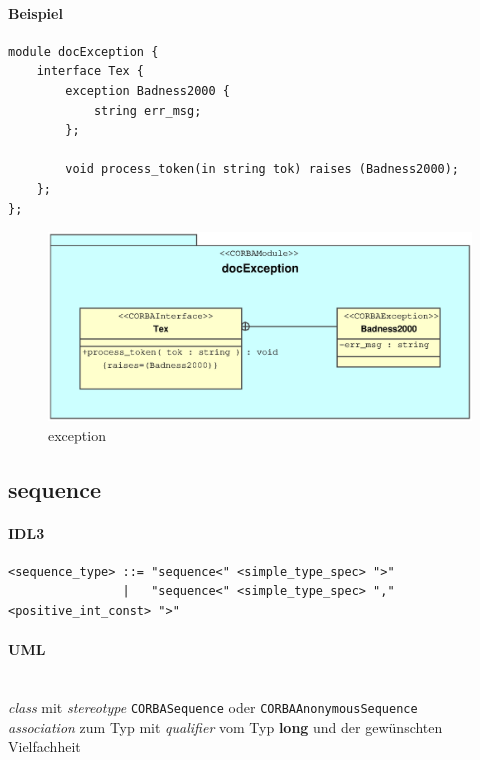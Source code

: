 \documentclass [a4paper,10pt] {scrartcl}
\begin{document}
\paragraph{Beispiel}
\begin{verbatim}
module docException {
    interface Tex {
        exception Badness2000 {
            string err_msg;
        };

        void process_token(in string tok) raises (Badness2000);
    };
};
\end{verbatim}
\begin{figure}[!h]
\centerline{\includegraphics[width=\linewidth]{docException.eps}}
\caption{exception}
\label{fig:exception}
\end{figure}

\cleardoublepage
\subsection{sequence}
\paragraph{IDL3}
\begin{verbatim}
<sequence_type> ::= "sequence<" <simple_type_spec> ">"
                |   "sequence<" <simple_type_spec> "," <positive_int_const> ">"
\end{verbatim}
\paragraph{UML}~\\
\emph{class} mit \emph{stereotype} \texttt{CORBASequence} oder \texttt{CORBAAnonymousSequence}\\
\emph{association} zum Typ mit \emph{qualifier} vom Typ \textbf{long} und der gew{\"u}nschten Vielfachheit\\
\end{document}
